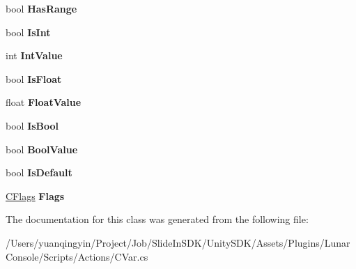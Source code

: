 \begin{DoxyCompactItemize}
\item 
\mbox{\label{class_lunar_console_plugin_1_1_c_var_a6974882dd5899d289095562071d75a77}} 
bool {\bfseries Has\+Range}
\item 
\mbox{\label{class_lunar_console_plugin_1_1_c_var_a0e4c9d36a3fe3fd117e21cea80c5d006}} 
bool {\bfseries Is\+Int}
\item 
\mbox{\label{class_lunar_console_plugin_1_1_c_var_aded2461076a6b68399a032a388d0d774}} 
int {\bfseries Int\+Value}
\item 
\mbox{\label{class_lunar_console_plugin_1_1_c_var_a1ccb5a2674c145b35222da5d8ae8aaba}} 
bool {\bfseries Is\+Float}
\item 
\mbox{\label{class_lunar_console_plugin_1_1_c_var_abe337c70c3e01fc51f6fb20551af2c90}} 
float {\bfseries Float\+Value}
\item 
\mbox{\label{class_lunar_console_plugin_1_1_c_var_a6e8106ab36e21d6332f02be87e723622}} 
bool {\bfseries Is\+Bool}
\item 
\mbox{\label{class_lunar_console_plugin_1_1_c_var_afdafe76bde60d2e02455d7535fd4a306}} 
bool {\bfseries Bool\+Value}
\item 
\mbox{\label{class_lunar_console_plugin_1_1_c_var_a30a3e0cd6301cfb3b4e95f9f0358368e}} 
bool {\bfseries Is\+Default}
\item 
\mbox{\label{class_lunar_console_plugin_1_1_c_var_a8066b3358a7675d55eaf96488a7e5280}} 
\mbox{\hyperlink{namespace_lunar_console_plugin_a7964ca4d001fe88527b3c508f034b34c}{C\+Flags}} {\bfseries Flags}
\end{DoxyCompactItemize}


The documentation for this class was generated from the following file\+:\begin{DoxyCompactItemize}
\item 
/\+Users/yuanqingyin/\+Project/\+Job/\+Slide\+In\+S\+D\+K/\+Unity\+S\+D\+K/\+Assets/\+Plugins/\+Lunar\+Console/\+Scripts/\+Actions/C\+Var.\+cs\end{DoxyCompactItemize}
